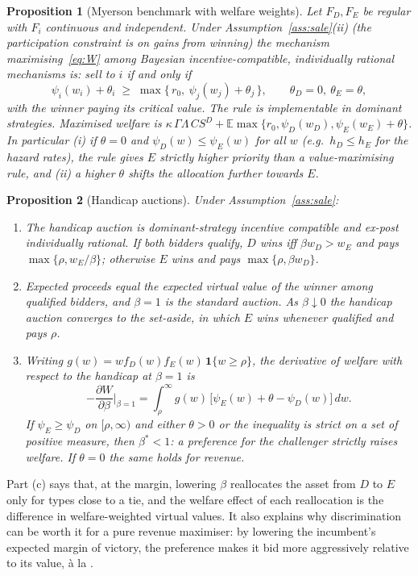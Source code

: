 \documentclass[12pt,a4paper]{article}
\newtheorem{proposition}{Proposition}
\theoremstyle{definition}
\theoremstyle{remark}
\newcommand{\E}{\mathbb{E}}
\begin{document}
\begin{proposition}[Myerson benchmark with welfare weights]\label{prop:myerson}
Let $F_D,F_E$ be regular with $F_i$ continuous and independent. Under Assumption~\ref{ass:sale}(ii) (the participation constraint is on gains from winning) the mechanism maximising~\eqref{eq:W} among Bayesian incentive-compatible, individually rational mechanisms is: sell to $i$ if and only if
\[
\psi_i(w_i)+\theta_i\;\ge\;\max\{\,r_0,\ \psi_j(w_j)+\theta_j\,\},\qquad \theta_D=0,\ \theta_E=\theta,
\]
with the winner paying its critical value. The rule is implementable in dominant strategies. Maximised welfare is $\kappa\,\Gamma\Lambda\, CS^D+\E\max\{r_0,\psi_D(w_D),\psi_E(w_E)+\theta\}$. In particular (i) if $\theta=0$ and $\psi_D(w)\le\psi_E(w)$ for all $w$ (e.g.\ $h_D\le h_E$ for the hazard rates), the rule gives $E$ strictly higher priority than a value-maximising rule, and (ii) a higher $\theta$ shifts the allocation further towards $E$.
\end{proposition}

\begin{proposition}[Handicap auctions]\label{prop:handicap}
Under Assumption~\ref{ass:sale}:
\begin{enumerate}
\item[(a)] The handicap auction is dominant-strategy incentive compatible and ex-post individually rational. If both bidders qualify, $D$ wins iff $\beta w_D>w_E$ and pays $\max\{\rho,w_E/\beta\}$; otherwise $E$ wins and pays $\max\{\rho,\beta w_D\}$.
\item[(b)] Expected proceeds equal the expected virtual value of the winner among qualified bidders, and $\beta=1$ is the standard auction. As $\beta\downarrow0$ the handicap auction converges to the set-aside, in which $E$ wins whenever qualified and pays $\rho$.
\item[(c)] Writing $g(w)=w f_D(w)f_E(w)\,\mathbf 1\{w\ge\rho\}$, the derivative of welfare with respect to the handicap at $\beta=1$ is
\[
-\frac{\partial W}{\partial\beta}\Big|_{\beta=1}=\int_\rho^\infty g(w)\,\big[\psi_E(w)+\theta-\psi_D(w)\big]\,dw .
\]
If $\psi_E\ge\psi_D$ on $[\rho,\infty)$ and either $\theta>0$ or the inequality is strict on a set of positive measure, then $\beta^*<1$: a preference for the challenger strictly raises welfare. If $\theta=0$ the same holds for revenue.
\end{enumerate}
\end{proposition}

Part (c) says that, at the margin, lowering $\beta$ reallocates the asset from $D$ to $E$ only for types close to a tie, and the welfare effect of each reallocation is the difference in welfare-weighted virtual values. It also explains why discrimination can be worth it for a pure revenue maximiser: by lowering the incumbent's expected margin of victory, the preference makes it bid more aggressively relative to its value, \`a la \citet{myerson1981}.
\end{document}
